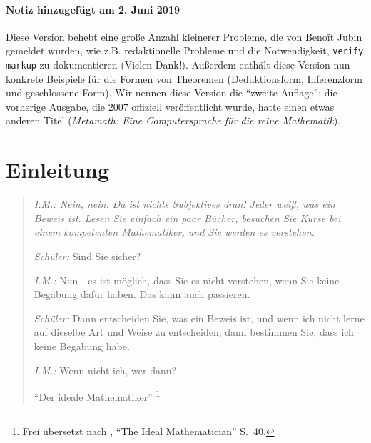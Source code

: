 \subsubsection{Notiz hinzugefügt am 2. Juni 2019}\label{note201906}

Diese Version behebt eine große Anzahl kleinerer Probleme, die von Beno\^{i}t Jubin gemeldet wurden, wie z.B. redaktionelle Probleme und die Notwendigkeit, \texttt{verify markup} zu dokumentieren (Vielen Dank!).
Außerdem enthält diese Version nun konkrete Beispiele für die Formen von Theoremen (Deduktionsform, Inferenzform und geschlossene Form).
Wir nennen diese Version die "`zweite Auflage"'; die vorherige Ausgabe, die 2007 offiziell veröffentlicht wurde, hatte einen etwas anderen Titel (\textit{Metamath: Eine Computersprache für die reine Mathematik}).


\chapter{Einleitung}

\begin{quotation}

  {\em {\em I.M.:}  Nein, nein.  Da ist nichts Subjektives dran!  Jeder weiß, was ein Beweis ist.  Lesen Sie einfach ein paar Bücher, besuchen Sie Kurse bei einem kompetenten Mathematiker, und Sie werden es verstehen.

  {\em Schüler:}  Sind Sie sicher?

  {\em I.M.:}  Nun - es ist möglich, dass Sie es nicht verstehen, wenn Sie keine Begabung dafür haben.  Das kann auch passieren.

  {\em Schüler:}  Dann entscheiden Sie, was ein Beweis ist, und wenn ich nicht lerne auf dieselbe Art und Weise zu entscheiden, dann bestimmen Sie, dass ich keine Begabung habe.

  {\em I.M.:}  Wenn nicht ich, wer dann?}

      \flushright\sc "`Der ideale Mathematiker"'
      \footnote{Frei übersetzt nach \cite{Davis}, \sc  "`The Ideal Mathematician"' S.~40.}\\
\end{quotation}

